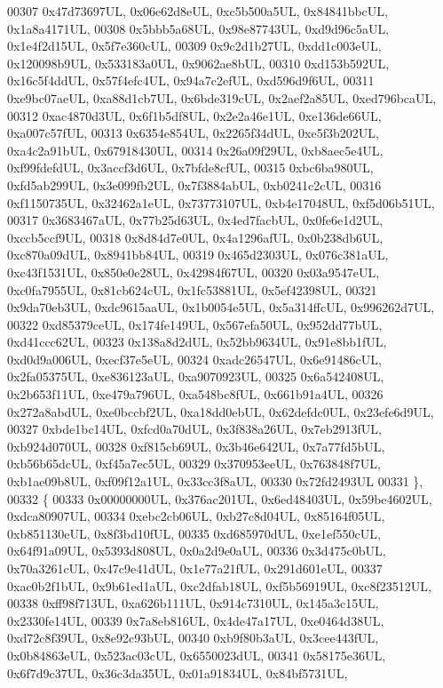 \begin{DoxyCode}
00307     0x47d73697UL, 0x06e62d8eUL, 0xc5b500a5UL, 0x84841bbcUL, 0x1a8a4171UL,
00308     0x5bbb5a68UL, 0x98e87743UL, 0xd9d96c5aUL, 0x1e4f2d15UL, 0x5f7e360cUL,
00309     0x9c2d1b27UL, 0xdd1c003eUL, 0x120098b9UL, 0x533183a0UL, 0x9062ae8bUL,
00310     0xd153b592UL, 0x16c5f4ddUL, 0x57f4efc4UL, 0x94a7c2efUL, 0xd596d9f6UL,
00311     0xe9bc07aeUL, 0xa88d1cb7UL, 0x6bde319cUL, 0x2aef2a85UL, 0xed796bcaUL,
00312     0xac4870d3UL, 0x6f1b5df8UL, 0x2e2a46e1UL, 0xe136de66UL, 0xa007c57fUL,
00313     0x6354e854UL, 0x2265f34dUL, 0xe5f3b202UL, 0xa4c2a91bUL, 0x67918430UL,
00314     0x26a09f29UL, 0xb8aec5e4UL, 0xf99fdefdUL, 0x3accf3d6UL, 0x7bfde8cfUL,
00315     0xbc6ba980UL, 0xfd5ab299UL, 0x3e099fb2UL, 0x7f3884abUL, 0xb0241c2cUL,
00316     0xf1150735UL, 0x32462a1eUL, 0x73773107UL, 0xb4e17048UL, 0xf5d06b51UL,
00317     0x3683467aUL, 0x77b25d63UL, 0x4ed7facbUL, 0x0fe6e1d2UL, 0xccb5ccf9UL,
00318     0x8d84d7e0UL, 0x4a1296afUL, 0x0b238db6UL, 0xc870a09dUL, 0x8941bb84UL,
00319     0x465d2303UL, 0x076c381aUL, 0xc43f1531UL, 0x850e0e28UL, 0x42984f67UL,
00320     0x03a9547eUL, 0xc0fa7955UL, 0x81cb624cUL, 0x1fc53881UL, 0x5ef42398UL,
00321     0x9da70eb3UL, 0xdc9615aaUL, 0x1b0054e5UL, 0x5a314ffcUL, 0x996262d7UL,
00322     0xd85379ceUL, 0x174fe149UL, 0x567efa50UL, 0x952dd77bUL, 0xd41ccc62UL,
00323     0x138a8d2dUL, 0x52bb9634UL, 0x91e8bb1fUL, 0xd0d9a006UL, 0xecf37e5eUL,
00324     0xadc26547UL, 0x6e91486cUL, 0x2fa05375UL, 0xe836123aUL, 0xa9070923UL,
00325     0x6a542408UL, 0x2b653f11UL, 0xe479a796UL, 0xa548bc8fUL, 0x661b91a4UL,
00326     0x272a8abdUL, 0xe0bccbf2UL, 0xa18dd0ebUL, 0x62defdc0UL, 0x23efe6d9UL,
00327     0xbde1bc14UL, 0xfcd0a70dUL, 0x3f838a26UL, 0x7eb2913fUL, 0xb924d070UL,
00328     0xf815cb69UL, 0x3b46e642UL, 0x7a77fd5bUL, 0xb56b65dcUL, 0xf45a7ec5UL,
00329     0x370953eeUL, 0x763848f7UL, 0xb1ae09b8UL, 0xf09f12a1UL, 0x33cc3f8aUL,
00330     0x72fd2493UL
00331   \},
00332   \{
00333     0x00000000UL, 0x376ac201UL, 0x6ed48403UL, 0x59be4602UL, 0xdca80907UL,
00334     0xebc2cb06UL, 0xb27c8d04UL, 0x85164f05UL, 0xb851130eUL, 0x8f3bd10fUL,
00335     0xd685970dUL, 0xe1ef550cUL, 0x64f91a09UL, 0x5393d808UL, 0x0a2d9e0aUL,
00336     0x3d475c0bUL, 0x70a3261cUL, 0x47c9e41dUL, 0x1e77a21fUL, 0x291d601eUL,
00337     0xac0b2f1bUL, 0x9b61ed1aUL, 0xc2dfab18UL, 0xf5b56919UL, 0xc8f23512UL,
00338     0xff98f713UL, 0xa626b111UL, 0x914c7310UL, 0x145a3c15UL, 0x2330fe14UL,
00339     0x7a8eb816UL, 0x4de47a17UL, 0xe0464d38UL, 0xd72c8f39UL, 0x8e92c93bUL,
00340     0xb9f80b3aUL, 0x3cee443fUL, 0x0b84863eUL, 0x523ac03cUL, 0x6550023dUL,
00341     0x58175e36UL, 0x6f7d9c37UL, 0x36c3da35UL, 0x01a91834UL, 0x84bf5731UL,

\end{DoxyCode}
